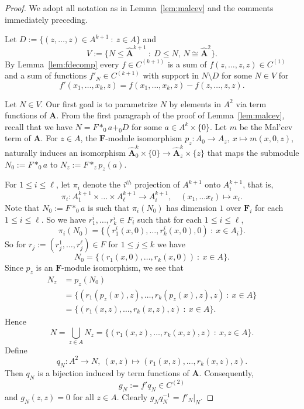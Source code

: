 \documentclass[12pt]{amsart}
\numberwithin{equation}{section}
\theoremstyle{plain}
\theoremstyle{definition}
\newcommand{\st}{\ :\ }
\newcommand{\A}{\mathbf{A}}
\newcommand{\F}{\mathbf{F}}
\begin{document}
\begin{proof}
  We adopt all notation as in Lemma~\ref{lem:malcev} and the comments immediately preceding.

  Let $D := \{ (z,\dots,z)\in A^{k+1} \st z\in A\}$ and
    \[V := \{ N\leq \hat{\A}^{k+1} \st D \leq N, \,  N \cong \hat{\A}^2 \}.\]
  By Lemma~\ref{lem:fdecomp} every $f\in C^{(k+1)}$ is a sum of $f(z,\dots,z,z) \in C^{(1)}$ and a sum of
    functions $f'_N \in C^{(k+1)}$ with support in $N\setminus D$ for some $N\in V$ for 
    \[f'(x_1, \dots, x_k,z) = f(x_1, \dots, x_k, z) - f(z,\ldots,z,z).\]

  Let $N\in V$. Our first goal is to parametrize $N$ by elements in $A^2$ via term functions of $\A$.
  From the first paragraph of the proof of Lemma~\ref{lem:malcev}, recall that we have $N = F*_0 a+_0 D$
    for some $a\in A^k\times \{0\}$.
  Let $m$ be the Mal'cev term of $\A$.
  For $z\in A$, the $\F$-module isomorphism $p_z\colon A_0\to A_z,\ x\mapsto m(x,0,z)$, 
    naturally induces an isomorphism $\hat{\A}_0^k \times \{0\} \to \hat{\A}_z^k \times \{z\}$ 
    that maps the submodule $N_0 := F *_0 a$ to $N_z := F *_z p_z(a)$.

  For $1 \le i \le \ell$, let $\pi_i$ denote the $i^{th}$ projection of $A^{k+1}$ onto $A_i^{k+1}$, 
    that is, 
    \[ \pi_i \colon A_1^{k+1} \times \dots \times A_\ell^{k+1} \rightarrow A_i^{k+1}, \quad (x_1, \dots x_\ell) \mapsto x_i.\]
  Note that $N_0 := F *_0 a$ is such that $\pi_i(N_0)$ has dimension $1$ over $\F_i$ for each $1 \le i \le \ell$.
  So we have $r_1^i,\dots,r_k^i\in F_i$ such that for each $1 \le i \le \ell$,
    \[\pi_i( N_0 )= \{(r_1^i(x,0),\dots,r_k^i(x,0),0) \st x\in A_i \}. \]
  So for $r_j := (r^1_j, \ldots, r^\ell_j) \in F$ for $1 \le j \le k$ we have 
    \[N_0 = \{(r_1(x,0), \ldots, r_k(x,0)) \st x \in A \}. \]
  Since $p_z$ is an $\F$-module isomorphism, we see that
    \begin{align*}
      N_z & = p_z(N_0) \\
      & = \{(r_1(p_z(x),z),\dots,r_k(p_z(x),z),z) \st x\in A \} \\
      & = \{(r_1(x,z),\dots,r_k(x,z),z) \st x\in A \}.
    \end{align*}
  Hence
    \[ N = \bigcup_{z\in A} N_z = \{(r_1(x,z),\dots,r_k(x,z),z) \st x,z \in A \}. \] 
  Define
    \[ q_N\colon A^2\to N,\ (x,z)\mapsto (r_1(x,z),\dots,r_k(x,z),z). \]
  Then $q_N$ is a bijection induced by term functions of $\A$. 
  Consequently,
    \[ g_N := f'q_N \in C^{(2)} \]
    and $g_N(z,z) = 0$ for all $z\in A$. Clearly $g_N q_N^{-1} = f'_N|_N$.


\end{proof}
\end{document}
